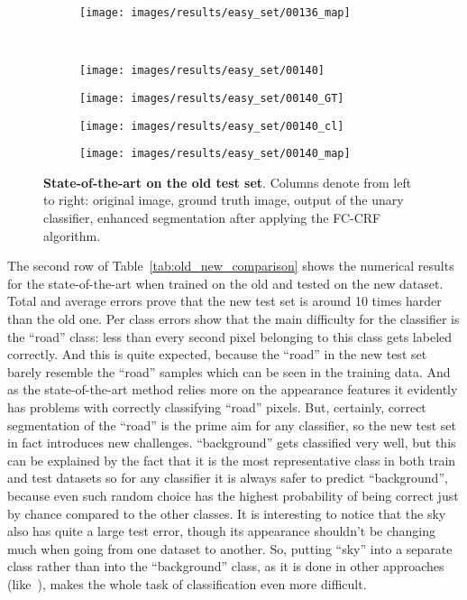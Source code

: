 \begin{figure}[t]
\begin{subfigure}[c]{0.24\textwidth}
  \centering
  \texttt{[image: images/results/easy\_set/00136\_map]}
 \end{subfigure}
 \\
 \begin{subfigure}[c]{0.24\textwidth}
  \centering
  \texttt{[image: images/results/easy\_set/00140]}
 \end{subfigure}
 \begin{subfigure}[c]{0.24\textwidth}
  \centering
  \texttt{[image: images/results/easy\_set/00140\_GT]}
 \end{subfigure}
 \begin{subfigure}[c]{0.24\textwidth}
  \centering
  \texttt{[image: images/results/easy\_set/00140\_cl]}
 \end{subfigure}
 \begin{subfigure}[c]{0.24\textwidth}
  \centering
  \texttt{[image: images/results/easy\_set/00140\_map]}
 \end{subfigure}
 \caption[State-of-the-art on the old test set]{{\bf State-of-the-art on the old test set}.
 Columns denote from left to right: original image, ground truth image, output of the unary classifier, enhanced segmentation after applying
 the FC-CRF algorithm.}\label{fig:easy_set_fc_crf}
\end{figure}

The second row of Table~\ref{tab:old_new_comparison} shows the numerical results for the state-of-the-art when trained on the old and tested on the new
dataset. Total and average errors prove that the new test set is around 10 times harder than the old one. Per class errors show that the main difficulty
for the classifier is the ``road'' class: less than every second pixel belonging to this class gets labeled correctly. And this is quite expected,
because the ``road'' in the new test set barely resemble the ``road'' samples which can be seen in the training data. And as the state-of-the-art method
relies more on the appearance features it evidently has problems with correctly classifying ``road'' pixels. But, certainly, correct segmentation of the
``road'' is the prime aim for any classifier, so the new test set in fact introduces new challenges. ``background'' gets classified very well, but this
can be explained by the fact that it is the most representative class in both train and test datasets so for any classifier it is always safer to predict
``background'', because even such random choice has the highest probability of being correct just by chance compared to the other classes. It is
interesting to notice that the sky also has quite a large test error, though its appearance shouldn't be changing much when going from one dataset to
another. So, putting ``sky'' into a separate class rather than into the ``background'' class, as it is done in other approaches (like~\cite{Alvarez2010}),
makes the whole task of classification even more difficult.

